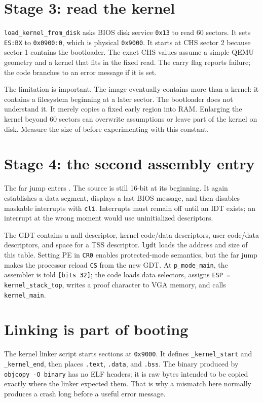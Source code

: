 \section{Stage 3: read the kernel}
\texttt{load\_kernel\_from\_disk} asks BIOS disk service \texttt{0x13} to read 60 sectors. It sets \texttt{ES:BX} to \texttt{0x0900:0}, which is physical \texttt{0x9000}. It starts at CHS sector 2 because sector 1 contains the bootloader. The exact CHS values assume a simple QEMU geometry and a kernel that fits in the fixed read. The carry flag reports failure; the code branches to an error message if it is set.

The limitation is important. The image eventually contains more than a kernel: it contains a filesystem beginning at a later sector. The bootloader does not understand it. It merely copies a fixed early region into RAM. Enlarging the kernel beyond 60 sectors can overwrite assumptions or leave part of the kernel on disk. Measure the size of  before experimenting with this constant.

\section{Stage 4: the second assembly entry}
The far jump enters . The source is still 16-bit at its beginning. It again establishes a data segment, displays a last BIOS message, and then disables maskable interrupts with \texttt{cli}. Interrupts must remain off until an IDT exists; an interrupt at the wrong moment would use uninitialized descriptors.

The GDT contains a null descriptor, kernel code/data descriptors, user code/data descriptors, and space for a TSS descriptor. \texttt{lgdt} loads the address and size of this table. Setting PE in \texttt{CR0} enables protected-mode semantics, but the far jump makes the processor reload \texttt{CS} from the new GDT. At \texttt{p\_mode\_main}, the assembler is told \texttt{[bits 32]}; the code loads data selectors, assigns \texttt{ESP = kernel\_stack\_top}, writes a proof character to VGA memory, and calls \texttt{kernel\_main}.

\section{Linking is part of booting}
The kernel linker script starts sections at \texttt{0x9000}. It defines \texttt{\_kernel\_start} and \texttt{\_kernel\_end}, then places \texttt{.text}, \texttt{.data}, and \texttt{.bss}. The binary produced by \texttt{objcopy -O binary} has no ELF headers; it is raw bytes intended to be copied exactly where the linker expected them. That is why a mismatch here normally produces a crash long before a useful error message.

